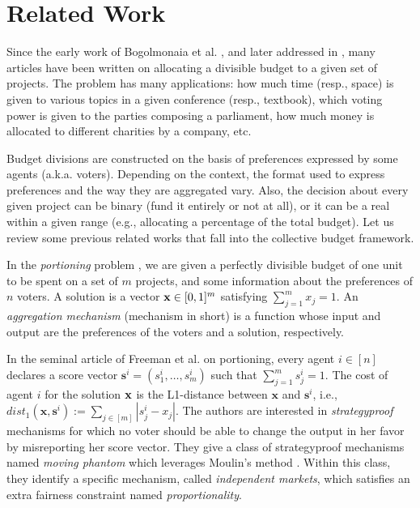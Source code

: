 \section{Related Work}
Since the early work of Bogolmonaia et al. \cite{BogomolnaiaMS05}, and later addressed in \cite{ABM20}, many articles have been written on allocating a divisible budget to a given set of projects. The problem has many applications: how much time (resp., space) 
is given to various topics in a given conference (resp., textbook),  which voting power is given to the parties composing a parliament, how much money is allocated to different charities by a company, etc.     


Budget divisions are constructed on the basis of preferences expressed by some agents (a.k.a. voters). Depending on the context, the format used to express preferences and the way they are aggregated vary. Also, the decision about every given project can be binary (fund it entirely or not at all), or it can be a real %
within a given range (e.g., allocating a percentage of the total budget).     
Let us review some previous related works that fall into the collective budget framework.   



In the \emph{portioning} problem \cite{MPS20,FPPV21,EST23,AACKLP23,GoyalSSG23,CCP24,FS24}, we are given a perfectly divisible budget of one unit to be spent on a set of $m$ projects, and some information about the preferences of $n$ voters. A solution is a vector ${\bf x} \in [0,1]^m$ satisfying $\sum_{j=1}^m x_j=1$. An \emph{aggregation mechanism} (mechanism in short) is a function whose input and output are the preferences of the voters and a solution, respectively.



In the seminal article of Freeman et al. \cite{FPPV21} on portioning, every agent $i \in [n]$ declares a score vector $\textbf{s}^i=(s^i_1, \ldots,s^i_m)$ such that $\sum_{j=1}^m s^i_j=1$. The cost of agent $i$ for the solution ${\bf x}$  is the L1-distance between $\textbf{x}$ and $\textbf{s}^i$, i.e.,  $dist_1(\textbf{x},\textbf{s}^i):=\sum_{j \in [m]} |s^i_j - x_j|$. The authors are interested in \emph{strategyproof} mechanisms for which no voter  should be able to change the output in her favor by misreporting her score vector. They give a class of strategyproof mechanisms named \emph{moving phantom} which leverages Moulin's method \cite{moulin1980strategy}. Within this class, they identify a specific mechanism, called \emph{independent markets}, which satisfies an extra fairness constraint named \emph{proportionality}.         


